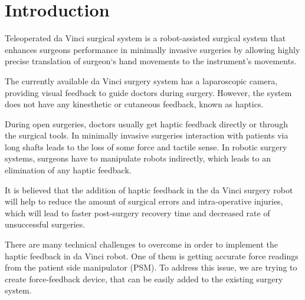\chapter{Introduction}
\label{intro} %


Teleoperated da Vinci surgical system is a robot-assisted surgical 
system that enhances surgeons performance in minimally invasive surgeries by 
allowing highly precise translation of surgeon`s hand movements to the instrument's movements. 

The currently available da Vinci surgery system 
has a laparoscopic camera, providing visual feedback to guide doctors during 
surgery. However, the system does not have any kinesthetic or cutaneous feedback, 
known as haptics.\cite{_intuitive_2018} 


During open surgeries, doctors usually get haptic feedback directly or through 
the surgical tools. In minimally invasive surgeries interaction with patients 
via long shafts leads to the loss of some force and tactile sense. In robotic 
surgery systems, surgeons have to manipulate robots indirectly, which leads to 
an elimination of any haptic feedback. \cite{okamura_haptic_2009} 

It is believed that the addition of haptic feedback in the da Vinci surgery 
robot will help to reduce the amount of surgical errors and intra-operative 
injuries, which will lead to faster post-surgery recovery time and decreased 
rate of unsuccessful surgeries. \cite{reiley_effects_2008, van_der_meijden_value_2009, okamura_haptic_2009}

There are many technical challenges to overcome in 
order to implement the haptic feedback in da Vinci robot. One of them is 
getting accurate force readings from the patient side manipulator (PSM). 
To address this issue, we are trying to create force-feedback device, that can 
be easily added to the existing surgery system.